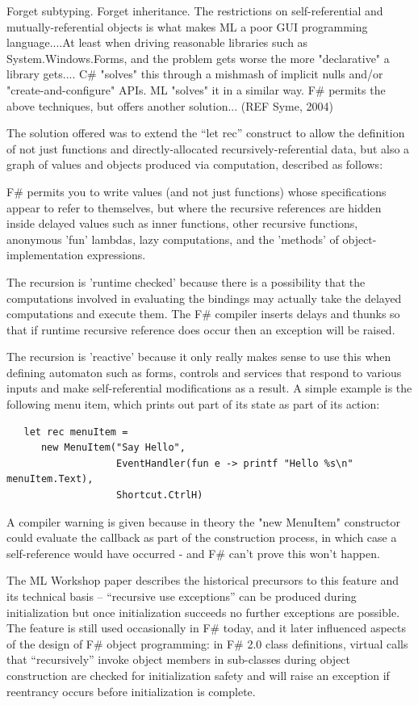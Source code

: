 \documentclass[acmsmall]{acmart}\settopmatter{}
\begin{document}
\begin{verbquote}
Forget subtyping.  Forget inheritance.   The restrictions on self-referential and mutually-referential objects is what makes ML a poor GUI programming language....At least when driving reasonable libraries such as System.Windows.Forms, and the problem gets worse the more "declarative" a library gets.... C# "solves" this through a mishmash of implicit nulls and/or "create-and-configure" APIs.   ML "solves" it in a similar way.  F# permits the above techniques, but offers another solution... (REF Syme, 2004)
\end{verbquote}
The solution offered was to extend the “let rec” construct to allow the definition of not just functions and directly-allocated recursively-referential data, but also a graph of values and objects produced via computation, described as follows:
\begin{verbquote}
F# permits you to write values (and not just functions) whose specifications appear to refer to themselves, but where the recursive references are hidden inside delayed values such as inner functions, other recursive functions, anonymous 'fun' lambdas, lazy computations, and the 'methods' of object-implementation expressions. 

The recursion is 'runtime checked' because there is a possibility that the computations involved in evaluating the bindings may actually take the delayed computations and execute them. The F# compiler inserts delays and thunks so that if runtime recursive reference does occur then an exception will be raised.

The recursion is 'reactive' because it only really makes sense to use this when defining automaton such as forms, controls and services that respond to various inputs and make self-referential modifications as a result. A simple example is the following menu item, which prints out part of its state as part of its action:
\end{verbquote}
\begin{verbatim}
   let rec menuItem = 
      new MenuItem("Say Hello", 
                   EventHandler(fun e -> printf "Hello %s\n" menuItem.Text), 
                   Shortcut.CtrlH)
\end{verbatim}
\begin{verbquote}
A compiler warning is given because in theory the "new MenuItem" constructor could evaluate the callback as part of the construction process, in which case a self-reference would have occurred - and F# can't prove this won't happen. 
\end{verbquote}
The ML Workshop paper describes the historical precursors to this feature and its technical basis – “recursive use exceptions” can be produced during initialization but once initialization succeeds no further exceptions are possible. The feature is still used occasionally in F\# today, and it later influenced aspects of the design of F\# object programming: in F\# 2.0 class definitions, virtual calls that “recursively” invoke object members in sub-classes during object construction are checked for initialization safety and will raise an exception if reentrancy occurs before initialization is complete. 
\end{document}
